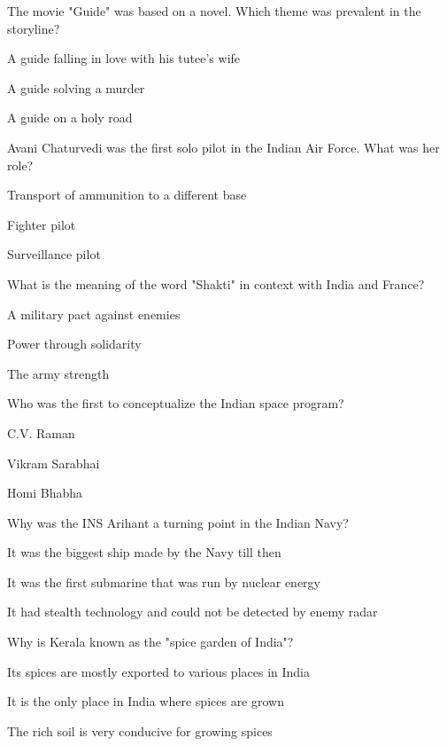 \begin{enhancedmcq}{The movie "Guide" was based on a novel. Which theme was prevalent in the storyline?}
\item A guide falling in love with his tutee's wife
\item A guide solving a murder
\item A guide on a holy road

\end{enhancedmcq}
\begin{enhancedmcq}{Avani Chaturvedi was the first solo pilot in the Indian Air Force. What was her role?}
\item Transport of ammunition to a different base
\item Fighter pilot
\item Surveillance pilot

\end{enhancedmcq}
\begin{enhancedmcq}{What is the meaning of the word "Shakti" in context with India and France?}
\item A military pact against enemies
\item Power through solidarity
\item The army strength

\end{enhancedmcq}
\begin{enhancedmcq}{Who was the first to conceptualize the Indian space program?}
\item C.V. Raman
\item Vikram Sarabhai
\item Homi Bhabha

\end{enhancedmcq}
\begin{enhancedmcq}{Why was the INS Arihant a turning point in the Indian Navy?}
\item It was the biggest ship made by the Navy till then
\item It was the first submarine that was run by nuclear energy
\item It had stealth technology and could not be detected by enemy radar

\end{enhancedmcq}
\begin{enhancedmcq}{Why is Kerala known as the "spice garden of India"?}
\item Its spices are mostly exported to various places in India
\item It is the only place in India where spices are grown
\item The rich soil is very conducive for growing spices

\end{enhancedmcq}
